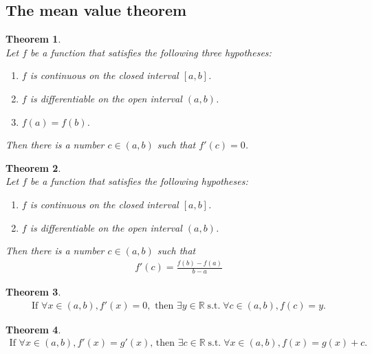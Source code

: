 \documentclass{article}
\DeclareMathOperator{\st}{s.t.}
\theoremstyle{sltheorem}
\newtheorem{theorem}{Theorem}[section]
\newcommand{\R}{\mathbb{R}}
\begin{document}
\subsection{The mean value theorem}
\begin{theorem}
    \\
    Let $f$ be a function that satisfies the following three hypotheses:
    \begin{enumerate}
        \item $f$ is continuous on the closed interval $[a,b]$.
        \item $f$ is differentiable on the open interval $(a,b)$.
        \item $f(a)=f(b)$.
    \end{enumerate}
    Then there is a number $c \in (a,b)$ such that $f'(c)=0$.
\end{theorem}
\begin{theorem}
    \\
    Let $f$ be a function that satisfies the following hypotheses:
    \begin{enumerate}
        \item $f$ is continuous on the closed interval $[a,b]$.
        \item $f$ is differentiable on the open interval $(a,b)$.
    \end{enumerate}
    Then there is a number $c\in(a,b)$ such that
    \begin{align*}
        f'(c)=\frac{f(b)-f(a)}{b-a}
    \end{align*}
\end{theorem}
\begin{theorem}
    \begin{align*}
        \text{If }
        \forall x\in(a,b), f'(x)=0, 
        \text{ then } 
        \exists y\in\R\st\forall c\in(a,b), f(c)=y.
    \end{align*}
\end{theorem}
\begin{theorem}
    \begin{align*}
        \text{If }\forall x\in(a,b), f'(x)=g'(x)\text{, then } \exists c\in\R \st\forall x\in (a,b), f(x)=g(x)+c.
    \end{align*}
\end{theorem}
\end{document}
